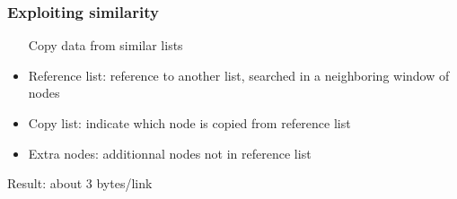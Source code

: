 \subsubsection{Exploiting similarity}

\begin{itemize}
  \item [Copy data from similar lists]
\item Reference list: reference to another list, searched in a
  neighboring window of nodes
\item Copy list: indicate which node is copied from reference list
\item Extra nodes: additionnal nodes not in reference list
\end{itemize}
Result: about 3 bytes/link

